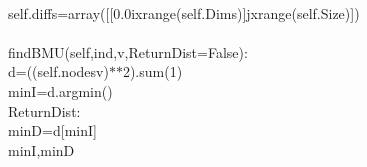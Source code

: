 {{\begin{tabbing}
\\
\hspace{48pt}self.diffs\hspace{6pt}=\hspace{6pt}array({[}{[}0.0\hspace{6pt}i\hspace{6pt}xrange(self.Dims){]}\hspace{6pt}j\hspace{6pt}xrange(self.Size){]})\\
\\
\hspace{6pt}findBMU(self,ind,v,ReturnDist\hspace{6pt}=\hspace{6pt}False):\\
\hspace{48pt}d\hspace{6pt}=\hspace{6pt}((self.nodes\dash{}v)$\ast$$\ast$2).sum(1)\\
\hspace{48pt}minI\hspace{6pt}=\hspace{6pt}d.argmin()\\
\hspace{6pt}ReturnDist:\\
\hspace{72pt}minD\hspace{6pt}=\hspace{6pt}d{[}minI{]}\\
\hspace{6pt}minI,minD\\
\\
$$
\end{tabbing}}}
